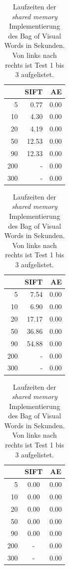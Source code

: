 \begin{table}
    \hfill
    \begin{tabular}[t]{| r | r | r |}
    \hline
	     & SIFT  & AE \\ \hline    
    5    &  0.77 & 0.00 \\ \hline
    10   &  4.30 & 0.00 \\ \hline
    20   &  4.19 & 0.00 \\ \hline
    50   & 12.53 & 0.00 \\ \hline
    90   & 12.33 & 0.00 \\ \hline
	200  & -     & 0.00 \\ \hline
	300  & -     & 0.00 \\ \hline    
    \end{tabular}
    \hfill
    \begin{tabular}[t]{| r | r | r |}
    \hline
	     & SIFT   & AE \\ \hline    
    5    &   7.54 & 0.00 \\ \hline
    10   &   6.90 & 0.00 \\ \hline
    20   &  17.17 & 0.00 \\ \hline
    50   &  36.86 & 0.00 \\ \hline
    90   &  54.88 & 0.00 \\ \hline
	200  &      - & 0.00 \\ \hline
	300  & 	    - & 0.00 \\ \hline
	\end{tabular}
    \hfill
    \begin{tabular}[t]{| r | c | c |}
    \hline
	     & SIFT & AE \\ \hline    
    5    & 0.00 & 0.00 \\ \hline
    10   & 0.00 & 0.00 \\ \hline
    20   & 0.00 & 0.00 \\ \hline
    50   & 0.00 & 0.00 \\ \hline
    90   & 0.00 & 0.00 \\ \hline
	200  & -    & 0.00 \\ \hline
	300  & -    & 0.00 \\ \hline
	\end{tabular}
    \hfill
	\caption{Laufzeiten der \textit{shared memory} Implementierung des Bag of Visual Words in Sekunden. Von links nach rechts ist Test 1 bis 3 aufgelistet.}
\end{table}